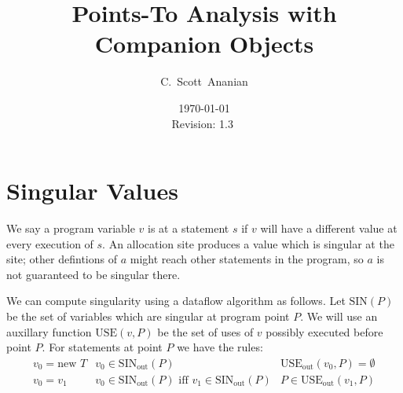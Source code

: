 \documentclass[11pt,notitlepage]{article}
\author{C.~Scott~Ananian}
\title{Points-To Analysis with Companion Objects}
\date{\today \\ $ $Revision: 1.3 $ $}
\begin{document}
%
\maketitle
\section{Singular Values}

We say a program variable $v$ is  at a statement $s$
if $v$ will have a different value at every execution of $s$.  An
allocation site  produces a value which is singular
at the site; other defintions of $a$ might reach other statements in
the program, so $a$ is not guaranteed to be singular there.

We can compute singularity using a dataflow algorithm as follows.
Let $\text{SIN}(P)$ be the set of variables which are singular
at program point $P$.  We will use an auxillary function
$\text{USE}(v, P)$ be the set of uses of $v$ possibly executed before
point $P$.  For statements at point $P$ we have the rules:
\begin{displaymath}
\begin{array}{lll}
v_0 = \text{new } T & v_0 \in \text{SIN}_{\text{out}}(P)
                    & \text{USE}_{\text{out}}(v_0, P) = \emptyset \\
v_0 = v_1 & v_0 \in \text{SIN}_{\text{out}}(P) \text{ iff }
            v_1 \in \text{SIN}_{\text{out}}(P)
          & P \in \text{USE}_{\text{out}}(v_1, P) \\

%
\end{array}
\end{displaymath}
\end{document}

